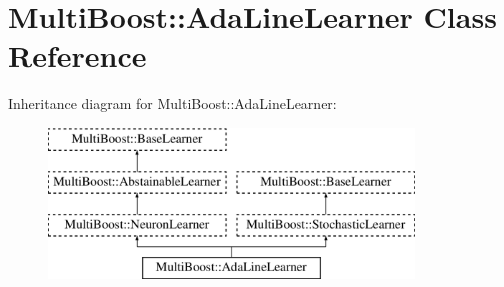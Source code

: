 \hypertarget{classMultiBoost_1_1AdaLineLearner}{\section{Multi\-Boost\-:\-:Ada\-Line\-Learner Class Reference}
\label{classMultiBoost_1_1AdaLineLearner}
}
Inheritance diagram for Multi\-Boost\-:\-:Ada\-Line\-Learner\-:\begin{figure}[H]
\begin{center}
\leavevmode
\includegraphics[height=4.000000cm]{classMultiBoost_1_1AdaLineLearner}
\end{center}
\end{figure}
